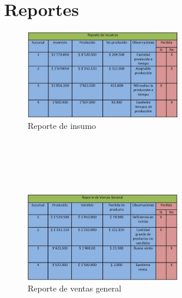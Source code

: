 \section{Reportes}
\begin{figure}[htbp]
	\centering
		\includegraphics[width=0.60\textwidth]{images/REPORTEDEINSUMO.jpg}
	\caption{Reporte de insumo}
	\label{fig:Reporte de insumo}
\end{figure}%
\\%
\\%
\\%
\\%
\begin{figure}[htbp]
	\centering
		\includegraphics[width=0.60\textwidth]{images/REPORTEDEVENTASGENERAL.jpg}
	\caption{Reporte de ventas general}
	\label{fig:Reporte de ventas general}
\end{figure}%

